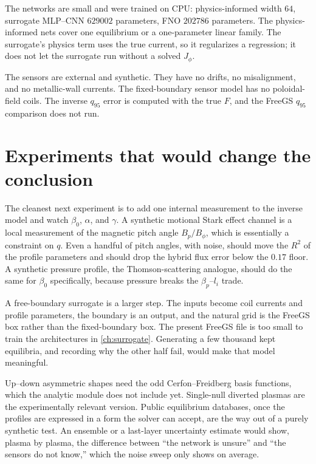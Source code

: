 \documentclass[11pt,a4paper,oneside,openany]{book}
\numberwithin{equation}{chapter}
\theoremstyle{definition}
\begin{document}
The networks are small and were trained on CPU: physics-informed width \(64\), surrogate MLP--CNN \(629002\) parameters, FNO \(202786\) parameters. The physics-informed nets cover one equilibrium or a one-parameter linear family. The surrogate's physics term uses the true current, so it regularizes a regression; it does not let the surrogate run without a solved \(J_{\phi}\).

The sensors are external and synthetic. They have no drifts, no misalignment, and no metallic-wall currents. The fixed-boundary sensor model has no poloidal-field coils. The inverse \(q_{95}\) error is computed with the true \(F\), and the FreeGS \(q_{95}\) comparison does not run.

\section{Experiments that would change the conclusion}

The cleanest next experiment is to add one internal measurement to the inverse model and watch \(\beta_{0}\), \(\alpha\), and \(\gamma\). A synthetic motional Stark effect channel is a local measurement of the magnetic pitch angle \(B_{p}/B_{\phi}\), which is essentially a constraint on \(q\). Even a handful of pitch angles, with noise, should move the \(R^{2}\) of the profile parameters and should drop the hybrid flux error below the \(0.17\) floor. A synthetic pressure profile, the Thomson-scattering analogue, should do the same for \(\beta_{0}\) specifically, because pressure breaks the \(\beta_{p}\)--\(l_{i}\) trade.

A free-boundary surrogate is a larger step. The inputs become coil currents and profile parameters, the boundary is an output, and the natural grid is the FreeGS box rather than the fixed-boundary box. The present FreeGS file is too small to train the architectures in \cref{ch:surrogate}. Generating a few thousand kept equilibria, and recording why the other half fail, would make that model meaningful.

Up--down asymmetric shapes need the odd Cerfon--Freidberg basis functions, which the analytic module does not include yet. Single-null diverted plasmas are the experimentally relevant version. Public equilibrium databases, once the profiles are expressed in a form the solver can accept, are the way out of a purely synthetic test. An ensemble or a last-layer uncertainty estimate would show, plasma by plasma, the difference between ``the network is unsure'' and ``the sensors do not know,'' which the noise sweep only shows on average.
\end{document}
